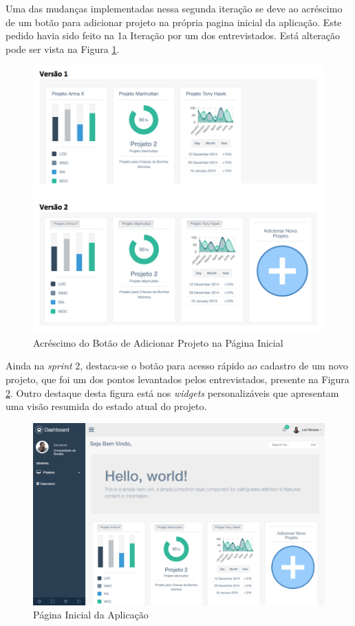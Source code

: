  Uma das mudanças implementadas nessa segunda iteração se deve ao acréscimo de um botão para adicionar projeto na própria pagina inicial da aplicação. Este pedido havia sido feito na 1a Iteração por um dos entrevistados. Está alteração pode ser vista na Figura \ref{img:compara_botao}.
 
 
 \graphicspath{{figuras/}}
 \begin{figure}[h!]
 \centering
 \includegraphics[scale=0.60]{compara_adicao_botao}
 \caption{Acréscimo do Botão de Adicionar Projeto na Página Inicial}
 \label{img:compara_botao}
 \end{figure}
 
Ainda na \textit{sprint} 2, destaca-se o botão para acesso rápido ao cadastro de um novo projeto, que foi um dos pontos levantados pelos entrevistados, presente na Figura \ref{img:pag_inicial}. Outro destaque desta figura está nos \textit{widgets} personalizáveis que apresentam uma visão resumida do estado atual do projeto.

\graphicspath{{figuras/}}
\begin{figure}[h!]
\centering
\includegraphics[scale=0.35]{pagina_inicial}
\caption{Página Inicial da Aplicação}
\label{img:pag_inicial}
\end{figure}

